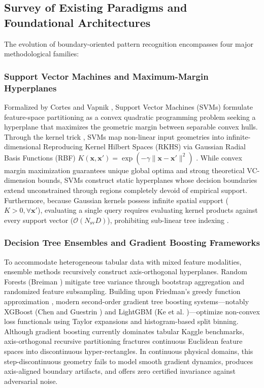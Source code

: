 \documentclass[preprint,review,12pt]{elsarticle}
\begin{document}
\subsection{Survey of Existing Paradigms and Foundational Architectures}
\label{sec:existing_work}

The evolution of boundary-oriented pattern recognition encompasses four major methodological families:

\subsubsection{Support Vector Machines and Maximum-Margin Hyperplanes}
Formalized by Cortes and Vapnik \cite{cortes1995support, vapnik1998statistical}, Support Vector Machines (SVMs) formulate feature-space partitioning as a convex quadratic programming problem seeking a hyperplane that maximizes the geometric margin between separable convex hulls. Through the kernel trick \cite{scholkopf2002learning}, SVMs map non-linear input geometries into infinite-dimensional Reproducing Kernel Hilbert Spaces (RKHS) via Gaussian Radial Basis Functions (RBF) $K(\mathbf{x}, \mathbf{x}') = \exp(-\gamma \|\mathbf{x} - \mathbf{x}'\|^2)$ \cite{broomhead1988multivariable}. While convex margin maximization guarantees unique global optima and strong theoretical VC-dimension bounds, SVMs construct static hyperplanes whose decision boundaries extend unconstrained through regions completely devoid of empirical support. Furthermore, because Gaussian kernels possess infinite spatial support ($K > 0, \forall \mathbf{x}'$), evaluating a single query requires evaluating kernel products against every support vector ($\mathcal{O}(N_{\mathrm{sv}} D)$), prohibiting sub-linear tree indexing \cite{omohundro1989five}.

\subsubsection{Decision Tree Ensembles and Gradient Boosting Frameworks}
To accommodate heterogeneous tabular data with mixed feature modalities, ensemble methods recursively construct axis-orthogonal hyperplanes. Random Forests (Breiman \cite{breiman2001random}) mitigate tree variance through bootstrap aggregation and randomized feature subsampling. Building upon Friedman's greedy function approximation \cite{friedman2001greedy}, modern second-order gradient tree boosting systems---notably XGBoost (Chen and Guestrin \cite{chen2016xgboost}) and LightGBM (Ke et al. \cite{ke2017lightgbm})---optimize non-convex loss functionals using Taylor expansions and histogram-based split binning. Although gradient boosting currently dominates tabular Kaggle benchmarks, axis-orthogonal recursive partitioning fractures continuous Euclidean feature spaces into discontinuous hyper-rectangles. In continuous physical domains, this step-discontinuous geometry fails to model smooth gradient dynamics, produces axis-aligned boundary artifacts, and offers zero certified invariance against adversarial noise.
\end{document}
